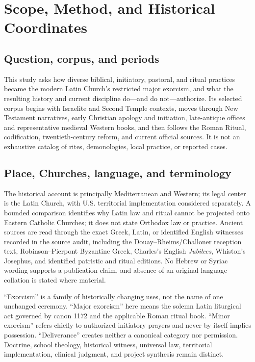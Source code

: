 \section{Scope, Method, and Historical Coordinates}

\subsection{Question, corpus, and periods}

This study asks how diverse biblical, initiatory, pastoral, and ritual
practices became the modern Latin Church's restricted major exorcism, and what
the resulting history and current discipline do---and do not---authorize. Its
selected corpus begins with Israelite and Second Temple contexts, moves through
New Testament narratives, early Christian apology and initiation, late-antique
offices and representative medieval Western books, and then follows the Roman
Ritual, codification, twentieth-century reform, and current official sources.
It is not an exhaustive catalog of rites, demonologies, local practice, or
reported cases.

\subsection{Place, Churches, language, and terminology}

The historical account is principally Mediterranean and Western; its legal
center is the Latin Church, with U.S. territorial implementation considered
separately. A bounded comparison identifies why Latin law and ritual cannot be
projected onto Eastern Catholic Churches; it does not state Orthodox law or
practice. Ancient sources are read through the exact Greek, Latin, or identified
English witnesses recorded in the source audit, including the
Douay--Rheims/Challoner reception text, Robinson--Pierpont Byzantine Greek,
Charles's English \emph{Jubilees}, Whiston's Josephus, and identified patristic
and ritual editions. No Hebrew or Syriac wording supports a publication claim,
and absence of an original-language collation is stated where material.

``Exorcism'' is a family of historically changing uses, not the name of one
unchanged ceremony. ``Major exorcism'' here means the solemn Latin liturgical
act governed by canon 1172 and the applicable Roman ritual book. ``Minor
exorcism'' refers chiefly to authorized initiatory prayers and never by itself
implies possession. ``Deliverance'' creates neither a canonical category nor
permission. Doctrine, school theology, historical witness, universal law,
territorial implementation, clinical judgment, and project synthesis remain
distinct.

